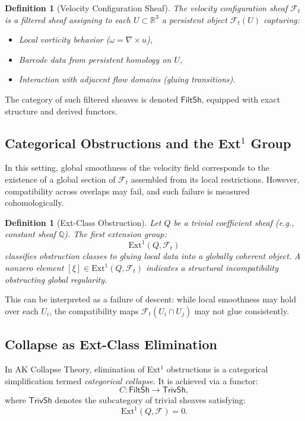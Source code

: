\documentclass[11pt]{article}
\newtheorem{definition}[theorem]{Definition}
\begin{document}
\begin{definition}[Velocity Configuration Sheaf]
The \emph{velocity configuration sheaf} \( \mathcal{F}_t \) is a filtered sheaf assigning to each \( U \subset \mathbb{R}^3 \) a persistent object \( \mathcal{F}_t(U) \) capturing:
\begin{itemize}
  \item Local vorticity behavior (\( \omega = \nabla \times u \)),
  \item Barcode data from persistent homology on \( U \),
  \item Interaction with adjacent flow domains (gluing transitions).
\end{itemize}
\end{definition}

The category of such filtered sheaves is denoted \( \mathsf{FiltSh} \), equipped with exact structure and derived functors.

\subsection{Categorical Obstructions and the Ext$^1$ Group}

In this setting, global smoothness of the velocity field corresponds to the existence of a global section of \( \mathcal{F}_t \) assembled from its local restrictions. However, compatibility across overlaps may fail, and such failure is measured cohomologically.

\begin{definition}[Ext-Class Obstruction]
Let \( Q \) be a trivial coefficient sheaf (e.g., constant sheaf \( \mathbb{Q} \)). The first extension group:
\[
\mathrm{Ext}^1(Q, \mathcal{F}_t)
\]
classifies obstruction classes to gluing local data into a globally coherent object. A nonzero element \( [\xi] \in \mathrm{Ext}^1(Q, \mathcal{F}_t) \) indicates a structural incompatibility obstructing global regularity.
\end{definition}

This can be interpreted as a failure of descent: while local smoothness may hold over each \( U_i \), the compatibility maps \( \mathcal{F}_t(U_i \cap U_j) \) may not glue consistently.

\subsection{Collapse as Ext-Class Elimination}

In AK Collapse Theory, elimination of Ext$^1$ obstructions is a categorical simplification termed \emph{categorical collapse}. It is achieved via a functor:
\[
C : \mathsf{FiltSh} \longrightarrow \mathsf{TrivSh},
\]
where \( \mathsf{TrivSh} \) denotes the subcategory of trivial sheaves satisfying:
\[
\mathrm{Ext}^1(Q, \mathcal{F}) = 0.
\]
\end{document}
